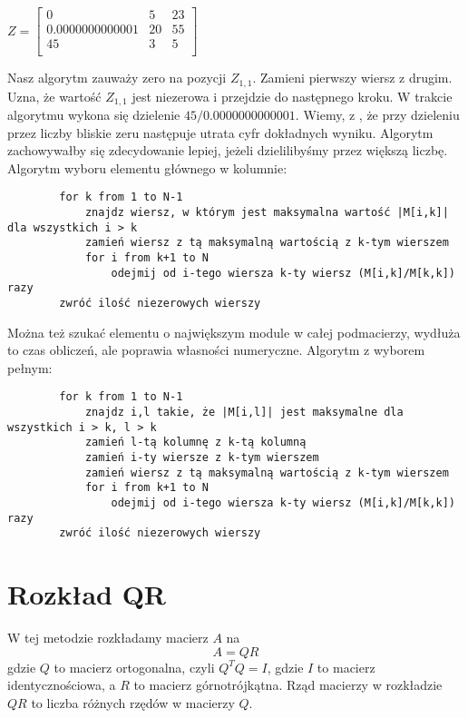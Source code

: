 \documentclass[a4paper,10pt]{article}
\begin{document}
	\begin{center}
	$Z = \left[ \begin{array}{ccccccccc}
			0 & 5 & 23\\
			0.0000000000001 &  20 & 55\\
			45 &  3 & 5\\
	\end{array} \right] $
	\end{center}
		Nasz algorytm zauważy zero na pozycji $Z_{1,1}$. Zamieni pierwszy wiersz z drugim. Uzna, że wartość $Z_{1,1}$ jest niezerowa i przejdzie
	do następnego kroku. W trakcie algorytmu wykona się dzielenie $45/0.0000000000001$. Wiemy, z \cite{SL}, że przy dzieleniu przez liczby bliskie zeru
	następuje utrata cyfr dokładnych wyniku. Algorytm zachowywałby się zdecydowanie lepiej, jeżeli dzielilibyśmy przez większą liczbę.
		Algorytm wyboru elementu głównego w kolumnie:
	\begin{verbatim}
		for k from 1 to N-1
		    znajdz wiersz, w którym jest maksymalna wartość |M[i,k]| dla wszystkich i > k
		    zamień wiersz z tą maksymalną wartością z k-tym wierszem
		    for i from k+1 to N
		        odejmij od i-tego wiersza k-ty wiersz (M[i,k]/M[k,k]) razy
		zwróć ilość niezerowych wierszy
	\end{verbatim}
	Można też szukać elementu o największym module w całej podmacierzy,
	wydłuża to czas obliczeń, ale poprawia własności numeryczne.
		Algorytm z wyborem pełnym:
	\begin{verbatim}
		for k from 1 to N-1
		    znajdz i,l takie, że |M[i,l]| jest maksymalne dla wszystkich i > k, l > k
		    zamień l-tą kolumnę z k-tą kolumną
		    zamień i-ty wiersze z k-tym wierszem
		    zamień wiersz z tą maksymalną wartością z k-tym wierszem
		    for i from k+1 to N
		        odejmij od i-tego wiersza k-ty wiersz (M[i,k]/M[k,k]) razy
		zwróć ilość niezerowych wierszy
	\end{verbatim}
	
\section{Rozkład QR}
	W tej metodzie rozkładamy macierz $A$ na
	\begin{equation}
		A = QR
	\end{equation}
	gdzie $Q$ to macierz ortogonalna, czyli $Q^TQ=I$, gdzie $I$ to macierz identycznościowa, a $R$ to macierz górnotrójkątna.
	Rząd macierzy w rozkładzie $QR$ to liczba różnych rzędów w macierzy $Q$.
\end{document}

